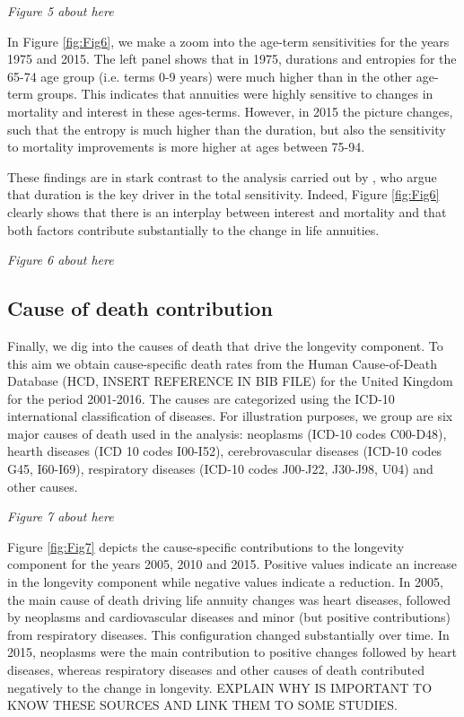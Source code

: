 \documentclass[12pt]{article}
\begin{document}
  \begin{center}
	\textit{Figure 5 about here}
\end{center}

In Figure \ref{fig:Fig6}, we make a zoom into the age-term sensitivities for the years 1975 and 2015. The left panel shows that in 1975, durations and entropies for the 65-74 age group (i.e. terms 0-9 years) were much higher than in the other age-term groups. This indicates that annuities were highly sensitive to changes in mortality and interest in these ages-terms. However, in 2015 the picture changes, such that the entropy is much higher than the duration, but also the sensitivity to mortality improvements is more higher at ages between 75-94.

These findings are in stark contrast to the analysis carried out by \citet{rabitti2020mortality}, who argue that duration is the key driver in the total sensitivity. Indeed, Figure \ref{fig:Fig6} clearly shows that there is an interplay between interest and mortality and that both factors contribute substantially to the change in life annuities. 

  \begin{center}
	\textit{Figure 6 about here}
\end{center}

\subsection{Cause of death contribution}

Finally, we dig into the causes of death that drive the longevity component. To this aim we obtain cause-specific death rates from the Human Cause-of-Death Database (HCD, INSERT REFERENCE IN BIB FILE) for the United Kingdom for the period 2001-2016. The causes are categorized using the ICD-10 international classification of diseases. For illustration purposes, we group  are six major causes of death used in the analysis: neoplasms (ICD-10 codes C00-D48), hearth diseases (ICD 10 codes I00-I52), cerebrovascular diseases (ICD-10 codes G45, I60-I69), respiratory diseases (ICD-10 codes J00-J22, J30-J98, U04) and other causes.

  \begin{center}
	\textit{Figure 7 about here}
\end{center}

Figure \ref{fig:Fig7} depicts the cause-specific contributions to the longevity component for the years 2005, 2010 and 2015. Positive values indicate an increase in the longevity component while negative values indicate a reduction. In 2005, the main cause of death driving life annuity changes was heart diseases, followed by neoplasms and cardiovascular diseases and minor (but positive contributions) from respiratory diseases. This configuration changed substantially over time. In 2015, neoplasms were the main contribution to positive changes followed by heart diseases, whereas respiratory diseases and other causes of death contributed negatively to the change in longevity. EXPLAIN WHY IS IMPORTANT TO KNOW THESE SOURCES AND LINK THEM TO SOME STUDIES.
\end{document}
